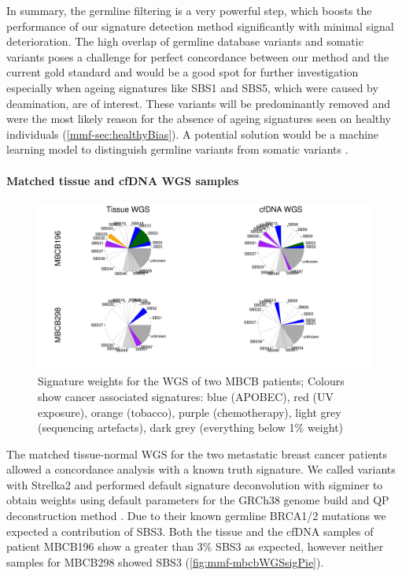 In summary, the germline filtering is a very powerful step, which boosts the performance of our signature detection method significantly with minimal signal deterioration. The high overlap of germline database variants and somatic variants poses a challenge for perfect concordance between our method and the current gold standard and would be a good spot for further investigation especially when ageing signatures like SBS1 and SBS5, which were caused by deamination, are  of interest. These  variants will be predominantly removed and were the most likely reason for the absence of ageing signatures seen on healthy individuals (\autoref{mmf-sec:healthyBias}). A potential solution would be a machine learning model to distinguish germline variants from somatic variants \cite{Spinella2016,Sahraeian2022}.

\paragraph{Matched tissue and cfDNA WGS samples}
\label{mmf-sec:matchedMBCB}

\begin{figure}[ht]
\centering
\includegraphics[width=.99\linewidth]{Figures/MisMatchFinder/mbcbWGSsignatures.pdf}
\caption[Signature weights for the WGS of two MBCB patients]{Signature weights for the WGS of two MBCB patients; Colours show cancer associated signatures: blue (APOBEC), red (UV exposure), orange (tobacco), purple (chemotherapy), light grey (sequencing artefacts), dark grey (everything below 1\% weight)}\label{fig:mmf-mbcbWGSsigPie}
\end{figure}
 
The matched tissue-normal WGS for the two metastatic breast cancer patients allowed a concordance analysis with a known truth signature. We called variants with Strelka2 and performed default signature deconvolution with sigminer to obtain weights using default parameters for the GRCh38 genome build and QP deconstruction method  \cite{Wang2021}. Due to their known germline BRCA1/2 mutations we expected a contribution of SBS3. Both the tissue and the cfDNA samples of patient MBCB196 show a greater than 3\% SBS3 as expected, however neither samples for MBCB298 showed SBS3 (\autoref{fig:mmf-mbcbWGSsigPie}).
 

